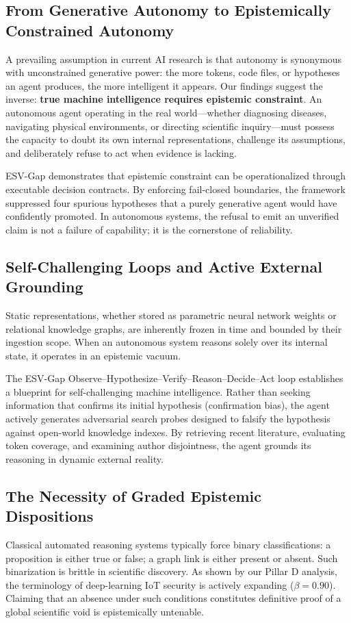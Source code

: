 \documentclass[conference,10pt]{IEEEtran}
\newcommand{\method}{ESV-Gap}
\begin{document}
\subsection{From Generative Autonomy to Epistemically Constrained Autonomy}
A prevailing assumption in current AI research is that autonomy is synonymous with unconstrained generative power: the more tokens, code files, or hypotheses an agent produces, the more intelligent it appears. Our findings suggest the inverse: \textbf{true machine intelligence requires epistemic constraint}. An autonomous agent operating in the real world---whether diagnosing diseases, navigating physical environments, or directing scientific inquiry---must possess the capacity to doubt its own internal representations, challenge its assumptions, and deliberately refuse to act when evidence is lacking.

\method{} demonstrates that epistemic constraint can be operationalized through executable decision contracts. By enforcing fail-closed boundaries, the framework suppressed four spurious hypotheses that a purely generative agent would have confidently promoted. In autonomous systems, the refusal to emit an unverified claim is not a failure of capability; it is the cornerstone of reliability.

\subsection{Self-Challenging Loops and Active External Grounding}
Static representations, whether stored as parametric neural network weights or relational knowledge graphs, are inherently frozen in time and bounded by their ingestion scope. When an autonomous system reasons solely over its internal state, it operates in an epistemic vacuum.

The \method{} Observe--Hypothesize--Verify--Reason--Decide--Act loop establishes a blueprint for self-challenging machine intelligence. Rather than seeking information that confirms its initial hypothesis (confirmation bias), the agent actively generates adversarial search probes designed to falsify the hypothesis against open-world knowledge indexes. By retrieving recent literature, evaluating token coverage, and examining author disjointness, the agent grounds its reasoning in dynamic external reality.

\subsection{The Necessity of Graded Epistemic Dispositions}
Classical automated reasoning systems typically force binary classifications: a proposition is either true or false; a graph link is either present or absent. Such binarization is brittle in scientific discovery. As shown by our Pillar D analysis, the terminology of deep-learning IoT security is actively expanding ($\beta = 0.90$). Claiming that an absence under such conditions constitutes definitive proof of a global scientific void is epistemically untenable.
\end{document}
